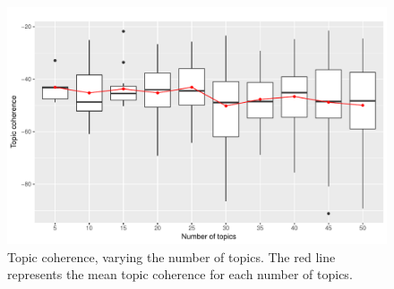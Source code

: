 \documentclass[11pt]{article}
\begin{document}
\begin{figure}[!ht]
	\centering %
	\caption{Topic coherence, varying the number of topics. The red line represents the mean topic coherence for each number of topics.}
	\label{numtopics_coherence}
	\includegraphics[width=\linewidth]{figures/coherence_numberoftopics.pdf}
\end{figure}
\end{document}
